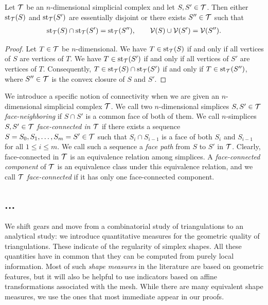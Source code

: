 \documentclass[10pt,a4paper]{article}
\begin{document}
\begin{lemma}
 Let ${\mathcal T}$ be an $n$-dimensional simplicial complex and let $S,S' \in {\mathcal T}$.
 Then either $\operatorname{st}_{{\mathcal T}}(S)$ and $\operatorname{st}_{{\mathcal T}}(S')$ are essentially disjoint or there exists $S'' \in {\mathcal T}$
 such that 
 \begin{align*}
    \operatorname{st}_{{\mathcal T}}(S) \cap \operatorname{st}_{{\mathcal T}}(S') = \operatorname{st}_{{\mathcal T}}(S''),
    \qquad 
    {\mathcal V}(S) \cup {\mathcal V}(S') = {\mathcal V}(S'').
 \end{align*}
\end{lemma}
\begin{proof}
 Let $T \in {\mathcal T}$ be $n$-dimensional.
 We have $T \in \operatorname{st}_{{\mathcal T}}(S )$ if and only if all vertices of $S $ are vertices of $T$.
 We have $T \in \operatorname{st}_{{\mathcal T}}(S')$ if and only if all vertices of $S'$ are vertices of $T$.
 Consequently, $T \in \operatorname{st}_{{\mathcal T}}(S) \cap \operatorname{st}_{{\mathcal T}}(S')$ if and only if $T \in \operatorname{st}_{{\mathcal T}}(S'')$,
 where $S'' \in {\mathcal T}$ is the convex closure of $S$ and $S'$.
\end{proof}

We introduce a specific notion of connectivity when we are given an $n$-dimensional simplicial complex ${\mathcal T}$. 
We call two $n$-dimensional simplices $S, S' \in {\mathcal T}$ \emph{face-neighboring} if $S \cap S'$ is a common face of both of them. 
We call $n$-simplices $S,S' \in {\mathcal T}$ \emph{face-connected in ${\mathcal T}$} if there exists a sequence $S=S_0,S_1,\dots,S_m=S' \in {\mathcal T}$ such that $S_{i} \cap S_{i-1}$ is a face of both $S_{i}$ and $S_{i-1}$ for all $1 \leq i \leq m$. 
We call such a sequence a \emph{face path} from $S$ to $S'$ in ${\mathcal T}$. 
Clearly, face-connected in ${\mathcal T}$ is an equivalence relation among simplices. 
A \emph{face-connected component} of ${\mathcal T}$ is an equivalence class under this equivalence relation, 
and we call ${\mathcal T}$ \emph{face-connected} if it has only one face-connected component. 


\subsection{...}

We shift gears and move from a combinatorial study of triangulations to an analytical study:
we introduce quantitative measures for the geometric quality of triangulations. 
These indicate of the regularity of simplex shapes. 
All these quantities have in common that they can be computed from purely local information. 
Most of such \emph{shape measures} in the literature are based on geometric features, 
but it will also be helpful to use indicators based on affine transformations associated with the mesh. %
While there are many equivalent shape measures, we use the ones that most immediate appear in our proofs.
\end{document}
